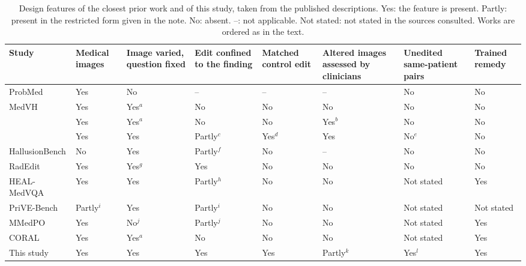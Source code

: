 \begin{table}[!t]
\caption{Design features of the closest prior work and of this study, taken from the published descriptions. Yes: the feature is present. Partly: present in the restricted form given in the note. No: absent. --: not applicable. Not stated: not stated in the sources consulted. Works are ordered as in the text.}
\label{tab:related}
\centering
\footnotesize
\setlength{\tabcolsep}{3pt}
\renewcommand{\arraystretch}{1.05}
\begin{tabular}{@{}L{0.27\textwidth}*{7}{>{\centering\arraybackslash}p{0.088\textwidth}}@{}}
\toprule
\textbf{Study} & \textbf{Medical images} & \textbf{Image varied, question fixed} & \textbf{Edit confined to the finding} & \textbf{Matched control edit} & \textbf{Altered images assessed by clinicians} & \textbf{Unedited same-patient pairs} & \textbf{Trained remedy} \\
\midrule
ProbMed \citep{yan2024probmed} & Yes & No & -- & -- & -- & No & No \\
MedVH \citep{gu2024medvh} & Yes & Yes$^{a}$ & No & No & No & No & No \\
\citet{gu2025illusion} & Yes & Yes$^{a}$ & No & No & Yes$^{b}$ & No & No \\
\citet{lotfinia2026image} & Yes & Yes & Partly$^{c}$ & Yes$^{d}$ & Yes & No$^{e}$ & No \\
HallusionBench \citep{guan2024hallusionbench} & No & Yes & Partly$^{f}$ & No & -- & No & No \\
RadEdit \citep{perez2024radedit} & Yes & Yes$^{g}$ & Yes & No & No & No & No \\
HEAL-MedVQA \citep{healmedvqa2024} & Yes & Yes & Partly$^{h}$ & No & No & Not stated & Yes \\
PriVE-Bench \citep{sun2026prive} & Partly$^{i}$ & Yes & Partly$^{i}$ & No & No & Not stated & Not stated \\
MMedPO \citep{zhu2024mmedpo} & Yes & No$^{j}$ & Partly$^{j}$ & No & No & Not stated & Yes \\
CORAL \citep{zafar2026coral} & Yes & Yes$^{a}$ & No & No & No & Not stated & Yes \\
\midrule
This study & Yes & Yes & Yes & Yes & Partly$^{k}$ & Yes$^{l}$ & Yes \\
\bottomrule

\end{tabular}
\end{table}

